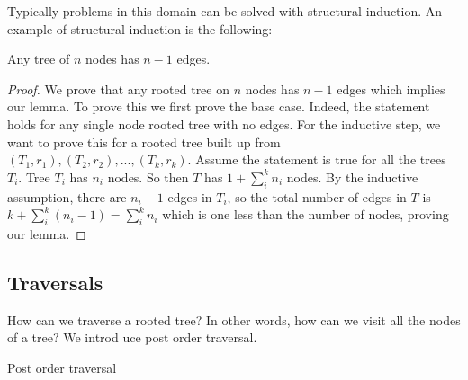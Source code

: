 Typically problems in this domain can be solved with structural
induction. An example of structural induction is the following:

\begin{lemma}
    Any tree of $n$ nodes has $n - 1$ edges.
\end{lemma}

\begin{proof}
    We prove that any rooted tree on $n$ nodes has $n - 1$ edges which
    implies our lemma. To prove this we first prove the base case.
    Indeed, the statement holds for any single node rooted tree with
    no edges. For the inductive step, we want to prove this for a
    rooted tree built up from $(T_1, r_1), (T_2, r_2), ..., (T_k,
    r_k)$. Assume the statement is true for all the trees $T_i$.
    Tree $T_i$ has $n_i$ nodes. So then $T$ has $1 + \sum_i^k n_i$
    nodes. By the inductive assumption, there are $n_i - 1$ edges in
    $T_i$, so the total number of edges in $T$ is 
    $k + \sum_i^k (n_i - 1) = \sum_i^k n_i$ which is one less than the
    number of nodes, proving our lemma.
\end{proof}

\subsection{Traversals}

How can we traverse a rooted tree? In other words, how can we visit
all the nodes of a tree? We introd  uce post order traversal.

\begin{algorithm}
\caption{Post order traversal}
\begin{algorithmic}
\ENDFOR
{}
\end{algorithmic}
\end{algorithm}

















